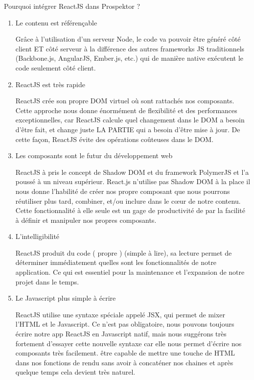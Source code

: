 Pourquoi int\'egrer ReactJS dans Prospektor ?

\begin{enumerate}
\item Le contenu est r\'ef\'eren\c{c}able

Gr\^ace \`a l'utilisation d'un serveur Node, le code va pouvoir \^etre g\'en\'er\'e c\^ot\'e client ET c\^ot\'e serveur \`a la diff\'erence des autres frameworks JS traditionnels (Backbone.js, AngularJS, Ember.js, etc.) qui de mani\`ere native ex\'ecutent le code seulement c\^ot\'e client.

\item ReactJS est tr\`es rapide

ReactJS cr\'ee son propre DOM virtuel o\`u sont rattach\'es nos composants. Cette approche nous donne \'enorm\'ement de flexibilit\'e et des performances exceptionnelles, car ReactJS calcule quel changement dans le DOM a besoin d'\^etre fait, et change juste LA PARTIE qui a besoin d'\^etre mise \`a jour. De cette fa\c{c}on, ReactJS \'evite des op\'erations co\^uteuses dans le DOM.

\item Les composants sont le futur du d\'eveloppement web

ReactJS \`a pris le concept de Shadow DOM et du framework PolymerJS et l'a pouss\'e \`a un niveau sup\'erieur. React.js n'utilise pas Shadow DOM \`a la place il nous donne l'habilit\'e de cr\'eer nos propre composant que nous pourrons r\'eutiliser plus tard, combiner, et/ou inclure dans le c\oe{}ur de notre contenu. Cette fonctionnalit\'e \`a elle seule est un gage de productivit\'e de par la facilit\'e \`a d\'efinir et manipuler nos propres composants.

\item L'intelligibilit\'e

ReactJS produit du code ( propre ) (simple \`a lire), sa lecture permet de d\'eterminer imm\'ediatement quelles sont les fonctionnalit\'es de notre application. Ce qui est essentiel pour la maintenance et l'expansion de notre projet dans le temps.

\item Le Javascript plus simple \`a \'ecrire

ReactJS utilise une syntaxe sp\'eciale appel\'e JSX, qui permet de mixer l'HTML et le Javascript. Ce n'est pas obligatoire, nous pouvons toujours \'ecrire notre app ReactJS en Javascript natif, mais nous sugg\'erons tr\`es fortement d'essayer cette nouvelle syntaxe car elle nous permet d'\'ecrire nos composants tr\`es facilement. \^etre capable de mettre une touche de HTML dans nos fonctions de rendu sans avoir \`a concat\'ener nos chaines et apr\`es quelque temps cela devient tr\`es naturel.

\end{enumerate}


